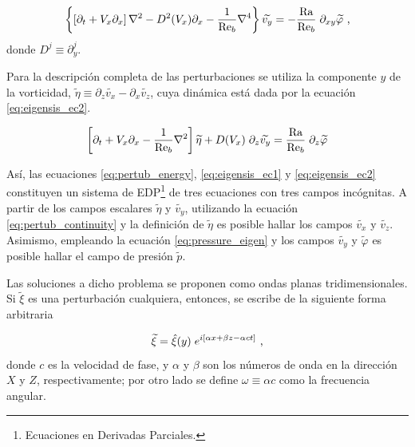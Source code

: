 \begin{equation}
\left\lbrace \left[ \partial_t + V_x \partial_x \right] \nabla^2 - D^2(V_x) \partial_x - \frac{1}{\text{Re}_b} \nabla^4 \right\rbrace \widetilde{v_y} = - \frac{\text{Ra}}{\text{Re}_b} \hspace{1mm} \partial_{xy} \widetilde{\varphi} \text{ ,}
\label{eq:eigensis_ec1}
\end{equation}
donde $D^j \equiv \partial^j_y$. 

Para la descripción completa de las perturbaciones se utiliza la componente $y$ de la vorticidad, $\widetilde{\eta} \equiv \partial_z \widetilde{v_x} - \partial_x \widetilde{v_z}$, cuya dinámica está dada por la ecuación \ref{eq:eigensis_ec2}.

\begin{equation}
 \left[ \partial_t + V_x \partial_x - \frac{1}{\text{Re}_b} \nabla^2  \right] \widetilde{\eta}  +  D(V_x) \hspace{1mm} \partial_z \widetilde{v_y} = \frac{\text{Ra}}{\text{Re}_b} \hspace{1mm} \partial_{z} \widetilde{\varphi}
\label{eq:eigensis_ec2}
\end{equation}

Así, las ecuaciones \ref{eq:pertub_energy}, \ref{eq:eigensis_ec1} y \ref{eq:eigensis_ec2} constituyen un sistema de EDP\footnote{Ecuaciones en Derivadas Parciales.} de tres ecuaciones con tres campos incógnitas. A partir de los campos escalares $\widetilde{\eta}$ y $\widetilde{v_y}$, utilizando la ecuación \ref{eq:pertub_continuity} y la definición de $\widetilde{\eta}$ es posible hallar los campos $\widetilde{v_x}$ y $\widetilde{v_z}$. Asimismo, empleando la ecuación \ref{eq:pressure_eigen} y los campos $\widetilde{v_y}$ y  $\widetilde{\varphi}$ es posible hallar el campo de presión  $\widetilde{p}$. 

Las soluciones a dicho problema se proponen como ondas planas tridimensionales. Si $\widetilde{\xi}$ es una perturbación cualquiera, entonces, se escribe de la siguiente forma arbitraria

\begin{equation}
\widetilde{\xi} = \hat{\xi}(y) \hspace{1mm} e^{i \left[ \alpha x + \beta z - \alpha c t \right]} \text{ ,}
\label{eq:waves3d}
\end{equation}
donde $c$  es la velocidad de fase, y $\alpha$ y $\beta$ son los números de onda en la dirección $X$ y $Z$, respectivamente; por otro lado se define $\omega \equiv \alpha c$ como la frecuencia angular. 

